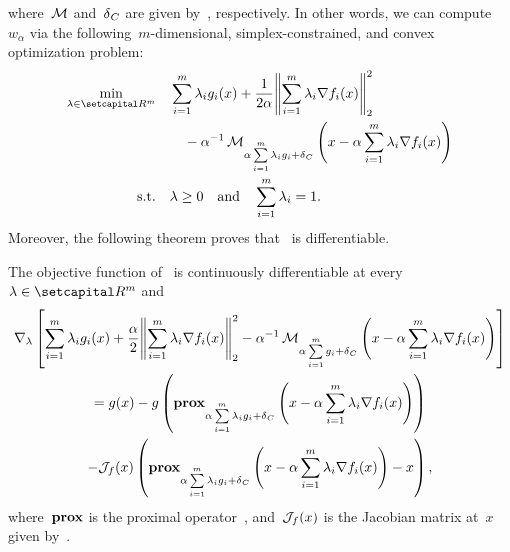 \documentclass[../../main]{subfiles}
\begin{document}
                           where~$\operatorname{\mathcal{M}}$ and~$\operatorname{\delta}_C$ are given by~, respectively.
                           In other words, we can compute~$w_\alpha$ via the following~$m$-dimensional, simplex-constrained, and convex optimization problem:
                           \begin{equation} \label{eq:dual_reg_lin_gap}
                               \begin{aligned}
                                   \min_{\lambda \in \setR^m} &&& \sum_{i = 1}^{m} \lambda_i g_i(x) + \frac{1}{2 \alpha} \norm*{\sum_{i = 1}^{m} \lambda_i \nabla f_i(x)}_2^2 \\
                                                              &&&\quad - \alpha^{-1} \envelope_{\alpha \sum\limits_{i = 1}^{m} \lambda_i g_i + \indicator_C}\left( x - \alpha \sum_{i = 1}^{m} \lambda_i \nabla f_i(x) \right)  \\
                                   \st &&& \lambda \ge 0 \eqand \sum_{i = 1}^{m} \lambda_i = 1 
                               .\end{aligned}
                           \end{equation} 
                           Moreover, the following theorem proves that~ is differentiable.
                           \begin{theorem} 
                               The objective function of~ is continuously differentiable at every~$\lambda \in \setR^m$ and
                               \begin{multline}
                                   \nabla_\lambda \left[ \sum_{i = 1}^{m} \lambda_i g_i(x) + \frac{\alpha}{2} \norm*{\sum_{i = 1}^{m} \lambda_i \nabla f_i(x)}_2^2 - \alpha^{-1} \envelope_{\alpha \sum\limits_{i = 1}^{m} g_i + \indicator_C}\left( x - \alpha \sum_{i = 1}^{m} \lambda_i \nabla f_i(x) \right)  \right] \\
                                   = g(x) - g\left( \prox_{\alpha \sum\limits_{i = 1}^{m} \lambda_i g_i + \indicator_C}\left( x - \alpha \sum_{i = 1}^{m} \lambda_i \nabla f_i(x) \right) \right) \\
                                   - \jdv{f}{x} \left( \prox_{\alpha \sum\limits_{i = 1}^{m} \lambda_i g_i + \indicator_C}\left( x - \alpha \sum_{i = 1}^{m} \lambda_i \nabla f_i(x) \right) - x \right) 
                               ,\end{multline}
                               where~$\operatorname{\mathbf{prox}}$ is the proximal operator~, and~$\mathcal{J}_{f}(x)$ is the Jacobian matrix at~$x$ given by~.
                           \end{theorem}
\end{document}
